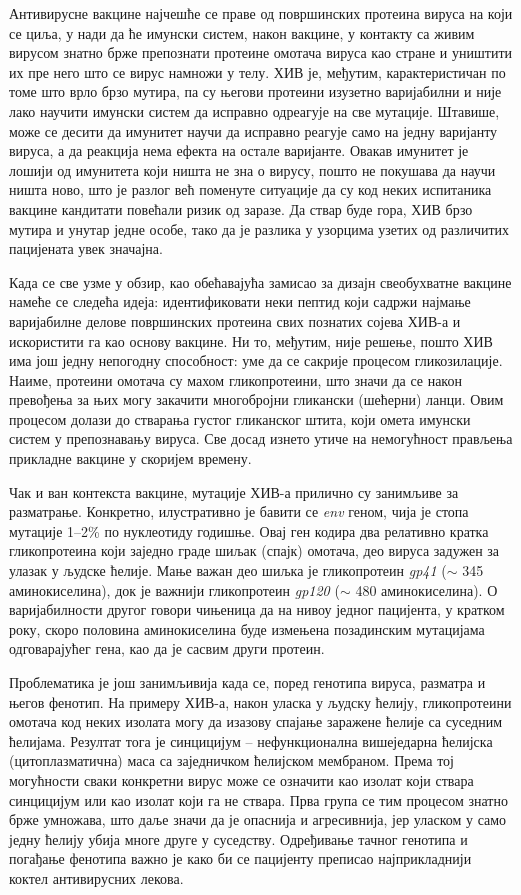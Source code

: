 \documentclass[12pt,oneside]{memoir}
\begin{document}
\begin{CJK}{UTF8}{ipxm}
Антивирусне вакцине најчешће се праве од површинских протеина вируса на који се циља, у нади да ће имунски систем, након вакцине, у контакту са живим вирусом знатно брже препознати протеине омотача вируса као стране и уништити их пре него што се вирус намножи у телу. ХИВ је, међутим, карактеристичан по томе што врло брзо мутира, па су његови протеини изузетно варијабилни и није лако научити имунски систем да исправно одреагује на све мутације. Штавише, може се десити да имунитет научи да исправно реагује само на једну варијанту вируса, а да реакција нема ефекта на остале варијанте. Овакав имунитет је лошији од имунитета који ништа не зна о вирусу, пошто не покушава да научи ништа ново, што је разлог већ поменуте ситуације да су код неких испитаника вакцине кандитати повећали ризик од заразе. Да ствар буде гора, ХИВ брзо мутира и унутар једне особе, тако да је разлика у узорцима узетих од различитих пацијената увек значајна.

Када се све узме у обзир, као обећавајућа замисао за дизајн свеобухватне вакцине намеће се следећа идеја: идентификовати неки пептид који садржи најмање варијабилне делове површинских протеина свих познатих сојева ХИВ-а и искористити га као основу вакцине. Ни то, међутим, није решење, пошто ХИВ има још једну непогодну способност: уме да се сакрије процесом гликозилације. Наиме, протеини омотача су махом гликопротеини, што значи да се након превођења за њих могу закачити многобројни гликански (шећерни) ланци. Овим процесом долази до стварања густог гликанског штита, који омета имунски систем у препознавању вируса. Све досад изнето утиче на немогућност прављења прикладне вакцине у скоријем времену.

Чак и ван контекста вакцине, мутације ХИВ-а прилично су занимљиве за разматрање. Конкретно, илустративно је бавити се \textit{env} геном, чија је стопа мутације 1--2\% по нуклеотиду годишње. Овај ген кодира два релативно кратка гликопротеина који заједно граде шиљак (спајк) омотача, део вируса задужен за улазак у људске ћелије. Мање важан део шиљка је гликопротеин \textit{gp41} ($\sim$ 345 аминокиселина), док је важнији гликопротеин \textit{gp120} ($\sim$ 480 аминокиселина). О варијабилности другог говори чињеница да на нивоу једног пацијента, у кратком року, скоро половина аминокиселина буде измењена позадинским мутацијама одговарајућег гена, као да је сасвим други протеин.

Проблематика је још занимљивија када се, поред генотипа вируса, разматра и његов фенотип. На примеру ХИВ-а, након уласка у људску ћелију, гликопротеини омотача код неких изолата могу да изазову спајање заражене ћелије са суседним ћелијама. Резултат тога је синцицијум -- нефункционална вишеједарна ћелијска (цитоплазматична) маса са заједничком ћелијском мембраном. Према тој могућности сваки конкретни вирус може се означити као изолат који ствара синцицијум или као изолат који га не ствара. Прва група се тим процесом знатно брже умножава, што даље значи да је опаснија и агресивнија, јер уласком у само једну ћелију убија многе друге у суседству. Одређивање тачног генотипа и погађање фенотипа важно је како би се пацијенту преписао најприкладнији коктел антивирусних лекова.


\end{CJK}
\end{document}

